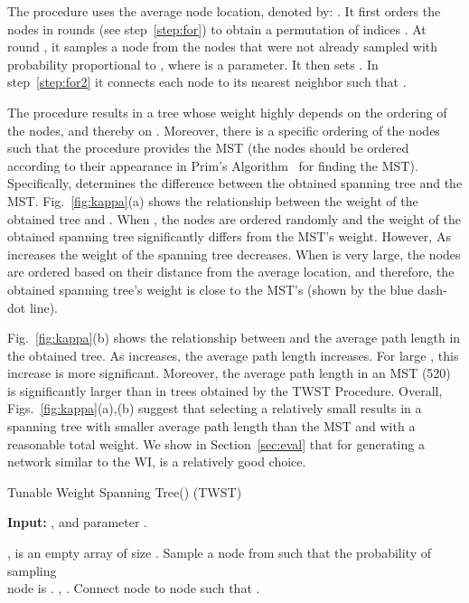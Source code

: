 \documentclass[10pt,journal]{IEEEtran}
\begin{document}
The procedure uses the average node location, denoted by: . It first orders the nodes in  rounds (see step~\ref{step:for}) to obtain a permutation of indices . At round , it samples a node  from the nodes that were not already sampled with probability proportional to , where  is a parameter. It then sets . In step~\ref{step:for2} it connects each node  to its nearest neighbor  such that .


The procedure results in a tree whose weight highly depends on the ordering of the nodes, and thereby on . Moreover, there is a specific ordering of the nodes such that the procedure provides the MST (the nodes should be ordered according to their appearance in Prim's Algorithm~\cite{cormen2009introduction} for finding the MST).
Specifically,  determines the difference between the obtained spanning tree and the MST. Fig.~\ref{fig:kappa}(a) shows the relationship between the weight of the obtained tree and . When , the nodes are ordered randomly and the weight of the obtained spanning tree significantly differs from the MST's weight. However, As  increases the weight of the spanning tree decreases. When  is very large, the nodes are ordered based on their distance from the average location, and therefore, the obtained spanning tree's weight is close to the MST's (shown by the blue dash-dot line).



Fig.~\ref{fig:kappa}(b) shows the relationship between  and the average path length in the obtained tree. As  increases, the average path length increases. For large , this increase is more significant. Moreover, the average path length in an MST (520) is significantly larger than in trees obtained by the TWST Procedure. Overall, Figs.~\ref{fig:kappa}(a),(b) suggest that selecting a relatively small   results in a spanning tree with smaller average path length than the MST and with a reasonable total weight.  We show in Section~\ref{sec:eval} that for generating a network similar to the WI,  is a relatively good choice.

\begin{procedure}[t]
\footnotesize
\caption{Tunable Weight Spanning Tree() (TWST)}
\begin{trivlist}
\item\textbf{Input:} , and parameter .
\end{trivlist}
\vspace*{-3mm}
\begin{algorithmic}[1]
\STATE ,  is an empty array of size .
\FOR {} \label{step:for}
\STATE Sample a node from  such that the probability of sampling \\node  is .
\STATE   , .
\ENDFOR
\FOR {}\label{step:for2}
\STATE Connect node  to node  such that .
\ENDFOR
\end{algorithmic}
\label{pro:span}
\end{procedure}
\end{document}
